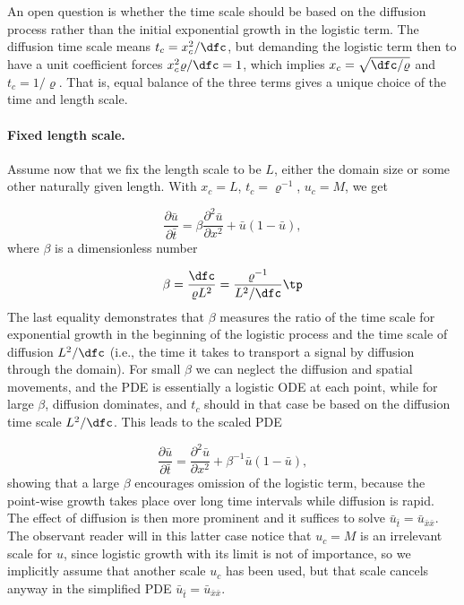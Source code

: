 \documentclass[graybox,envcountchap,sectrefs,final]{svmonodo}
\begin{document}
An open question is whether the time scale should be based on
the diffusion process rather than the initial exponential growth
in the logistic term. The diffusion time scale means $t_c = x_c^2/\dfc$,
but demanding the logistic term then to have a unit coefficient
forces $x_c^2\varrho /\dfc = 1$, which implies $x_c=\sqrt{\dfc/\varrho}$
and $t_c=1/\varrho$. That is, equal balance of the three
terms gives a unique choice of the time and length scale.

\paragraph{Fixed length scale.}
Assume now that we fix the length scale to be $L$, either the
domain size or some other naturally given length. With
$x_c=L$, $t_c=\varrho^{-1}$,
$u_c=M$, we get

\begin{equation}
\frac{\partial \bar u}{\partial \bar t} =
\beta
\frac{\partial^2 \bar u}{\partial x^2} + \bar u (1 - \bar u),
\end{equation}
where $\beta$ is a dimensionless number

\[ \beta = \frac{\dfc}{\varrho L^2} = \frac{\varrho^{-1}}{L^2/\dfc}\tp\]
The last equality demonstrates
that $\beta$ measures the ratio of the time scale
for exponential growth in the beginning of the logistic process
and the time scale of diffusion $L^2/\dfc$ (i.e., the time it takes
to transport a signal by diffusion through the domain).
For small $\beta$ we can neglect the diffusion and spatial movements,
and the PDE is essentially a logistic ODE at each point, while for
large $\beta$, diffusion dominates, and $t_c$ should in that case be
based on the diffusion time scale $L^2/\dfc$. This leads to the
scaled PDE

\begin{equation}
\frac{\partial \bar u}{\partial \bar t} =
\frac{\partial^2 \bar u}{\partial x^2} + \beta^{-1}\bar u (1 - \bar u),
\end{equation}
showing that a large $\beta$ encourages omission of the logistic term,
because the point-wise growth takes place over long time intervals while
diffusion is rapid. The effect of diffusion is then more prominent
and it suffices to solve $\bar u_{\bar t} = \bar u_{\bar x\bar x}$.
The observant reader will in this latter case notice that $u_c=M$
is an irrelevant scale for $u$, since logistic growth with its limit is
not of importance, so we implicitly assume that another scale $u_c$
has been used, but that scale cancels anyway in the simplified PDE
$\bar u_{\bar t} = \bar u_{\bar x\bar x}$.
\end{document}
